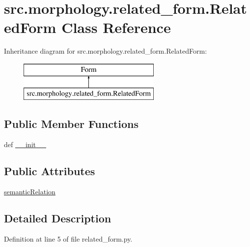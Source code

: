 \hypertarget{classsrc_1_1morphology_1_1related__form_1_1_related_form}{\section{src.\+morphology.\+related\+\_\+form.\+Related\+Form Class Reference}
\label{classsrc_1_1morphology_1_1related__form_1_1_related_form}
}
Inheritance diagram for src.\+morphology.\+related\+\_\+form.\+Related\+Form\+:\begin{figure}[H]
\begin{center}
\leavevmode
\includegraphics[height=2.000000cm]{classsrc_1_1morphology_1_1related__form_1_1_related_form}
\end{center}
\end{figure}
\subsection*{Public Member Functions}
\begin{DoxyCompactItemize}
\item 
def \hyperlink{classsrc_1_1morphology_1_1related__form_1_1_related_form_abdb8f278733f3a984fd77232c417fde4}{\+\_\+\+\_\+init\+\_\+\+\_\+}
\end{DoxyCompactItemize}
\subsection*{Public Attributes}
\begin{DoxyCompactItemize}
\item 
\hyperlink{classsrc_1_1morphology_1_1related__form_1_1_related_form_a266c933a3387b83a172bc18bb1bcc556}{semantic\+Relation}
\end{DoxyCompactItemize}


\subsection{Detailed Description}


Definition at line 5 of file related\+\_\+form.\+py.



